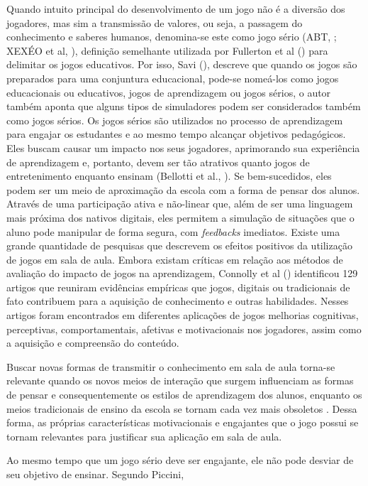 Quando intuito principal do desenvolvimento de um jogo não é a diversão dos jogadores, mas sim a transmissão de valores, ou seja, a passagem do conhecimento e saberes humanos, denomina-se este como jogo sério (ABT, \citeyear{abt1970}; XEXÉO et al, \citeyear{xexeo2017}), definição semelhante utilizada por Fullerton et al (\citeyear{fullerton2004}) para delimitar os jogos educativos. Por isso, Savi (\citeyear{savi2008}), descreve que quando os jogos são preparados para uma conjuntura educacional, pode-se nomeá-los como jogos educacionais ou educativos, jogos de aprendizagem ou jogos sérios, o autor também aponta que alguns tipos de simuladores podem ser considerados também como jogos sérios. Os jogos sérios são utilizados no processo de aprendizagem para engajar os estudantes e ao mesmo tempo alcançar objetivos pedagógicos. Eles buscam causar um impacto nos seus jogadores, aprimorando sua experiência de aprendizagem e, portanto, devem ser tão atrativos quanto jogos de entretenimento enquanto ensinam (Bellotti et al., \citeyear{bellotti2013}). Se bem-sucedidos, eles podem ser um meio de aproximação da escola com a forma de pensar dos alunos. Através de uma participação ativa e não-linear que, além de ser uma linguagem mais próxima dos nativos digitais, eles permitem a simulação de situações que o aluno pode manipular de forma segura, com \textit{feedbacks} imediatos. Existe uma grande quantidade de pesquisas que descrevem os efeitos positivos da utilização de jogos em sala de aula. Embora existam críticas em relação aos métodos de avaliação do impacto de jogos na aprendizagem, Connolly et al (\citeyear{connolly2012}) identificou 129 artigos que reuniram evidências empíricas que jogos, digitais ou tradicionais de fato contribuem para a aquisição de conhecimento e outras habilidades. Nesses artigos foram encontrados em diferentes aplicações de jogos melhorias cognitivas, perceptivas, comportamentais, afetivas e motivacionais nos jogadores, assim como a aquisição e compreensão do conteúdo.

Buscar novas formas de transmitir o conhecimento em sala de aula torna-se relevante quando os novos meios de interação que surgem influenciam as formas de pensar e consequentemente os estilos de aprendizagem dos alunos, enquanto os meios tradicionais de ensino da escola se tornam cada vez mais obsoletos \cite{prensky2012}. Dessa forma, as próprias características motivacionais e engajantes que o jogo possui se tornam relevantes para justificar sua aplicação em sala de aula.

Ao mesmo tempo que um jogo sério deve ser engajante, ele não pode desviar de seu objetivo de ensinar. Segundo Piccini,

